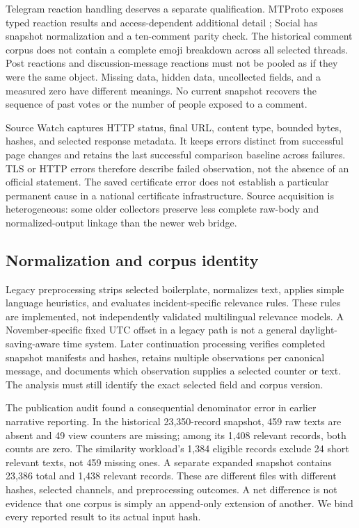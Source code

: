 Telegram reaction handling deserves a separate qualification. MTProto exposes typed reaction results and access-dependent additional detail \citep{telegram2026reactions}; Social has snapshot normalization and a ten-comment parity check. The historical comment corpus does not contain a complete emoji breakdown across all selected threads. Post reactions and discussion-message reactions must not be pooled as if they were the same object. Missing data, hidden data, uncollected fields, and a measured zero have different meanings. No current snapshot recovers the sequence of past votes or the number of people exposed to a comment.

Source Watch captures HTTP status, final URL, content type, bounded bytes, hashes, and selected response metadata. It keeps errors distinct from successful page changes and retains the last successful comparison baseline across failures. TLS or HTTP errors therefore describe failed observation, not the absence of an official statement. The saved certificate error does not establish a particular permanent cause in a national certificate infrastructure. Source acquisition is heterogeneous: some older collectors preserve less complete raw-body and normalized-output linkage than the newer web bridge.

\subsection{Normalization and corpus identity}
Legacy preprocessing strips selected boilerplate, normalizes text, applies simple language heuristics, and evaluates incident-specific relevance rules. These rules are implemented, not independently validated multilingual relevance models. A November-specific fixed UTC offset in a legacy path is not a general daylight-saving-aware time system. Later continuation processing verifies completed snapshot manifests and hashes, retains multiple observations per canonical message, and documents which observation supplies a selected counter or text. The analysis must still identify the exact selected field and corpus version.

The publication audit found a consequential denominator error in earlier narrative reporting. In the historical 23,350-record snapshot, 459 raw texts are absent and 49 view counters are missing; among its 1,408 relevant records, both counts are zero. The similarity workload's 1,384 eligible records exclude 24 short relevant texts, not 459 missing ones. A separate expanded snapshot contains 23,386 total and 1,438 relevant records. These are different files with different hashes, selected channels, and preprocessing outcomes. A net difference is not evidence that one corpus is simply an append-only extension of another. We bind every reported result to its actual input hash.


